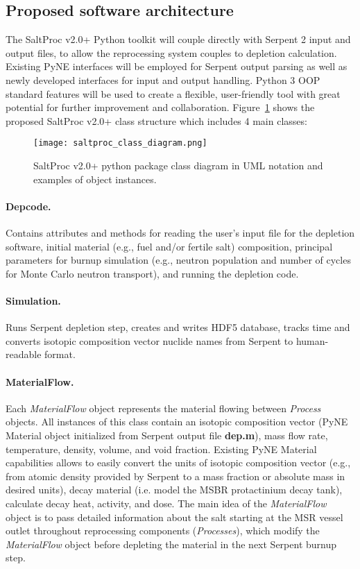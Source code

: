 \subsection{Proposed software architecture}
The SaltProc v2.0+ Python toolkit will couple directly with Serpent 2 input 
and output files, to allow the reprocessing system couples to depletion 
calculation. Existing PyNE interfaces will be employed for Serpent output 
parsing as well as newly developed interfaces for input and output handling. 
Python 3 \gls{OOP} standard features will be used to create a flexible, 
user-friendly tool with great potential for further improvement and 
collaboration. Figure~\ref{fig:saltproc_class} shows the proposed SaltProc 
v2.0+ class structure which includes 4 main classes:
\begin{figure}[ht!] %
	\texttt{[image: saltproc\_class\_diagram.png]}
	\vspace{-0.15in}
	\caption{SaltProc v2.0+ python package class diagram in UML notation 
		and examples of object instances.}
	\label{fig:saltproc_class}
\end{figure}
\paragraph{Depcode.}Contains attributes and methods for reading the user's 
input file for the depletion software, initial material (e.g., fuel and/or 
fertile salt) composition, principal parameters for burnup simulation (e.g., 
neutron population and number of cycles for Monte Carlo neutron transport), 
and running the depletion code.
\paragraph{Simulation.}Runs Serpent depletion step, creates and writes HDF5 
database, tracks time and converts isotopic composition vector nuclide names 
from Serpent to human-readable format.
\paragraph{MaterialFlow.}Each \textit{MaterialFlow} object 
represents the material flowing between \textit{Process} objects. 
All instances of this class contain an isotopic composition vector 
(PyNE Material object initialized from Serpent output file \textbf{dep.m}), 
mass flow rate, temperature, density, volume, and void fraction. Existing PyNE 
Material capabilities allows to easily convert the units of isotopic  
composition vector (e.g., from atomic density provided by Serpent to 
a mass fraction or absolute mass in desired units), decay material 
(i.e. model the \gls{MSBR} protactinium decay tank), calculate 
decay heat, activity, and dose. The main idea of the \textit{MaterialFlow} 
object is to pass detailed information about the salt starting at the 
\gls{MSR} vessel outlet throughout reprocessing components 
(\textit{Processes}), which modify the \textit{MaterialFlow} 
object before depleting the material in the next Serpent burnup step.

